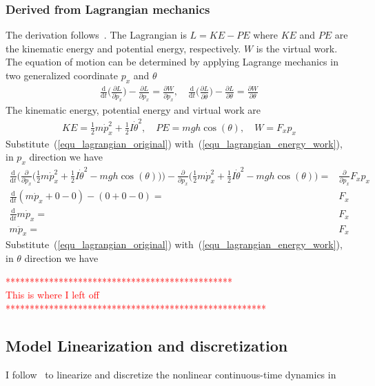 \documentclass[12pt]{article}
\begin{document}
\subsubsection{Derived from Lagrangian mechanics}
The derivation follows~\cite{peacock_2007_mit_lagrange}.
The Lagrangian is $L=KE-PE$ where $KE$ and $PE$ are the
kinematic energy and potential energy, respectively.
$W$ is the virtual work.
The equation of motion can be determined by applying
Lagrange mechanics in two generalized coordinate $p_x$ and $\theta$
\begin{align}
\label{equ_lagrangian_original}
\frac{\mathrm{d}}{\mathrm{d}t}\bigg(
\frac{\partial L}{\partial \dot{p}_x}\bigg)
-\frac{\partial L}{\partial p_x}=
\frac{\partial W}{\partial p_x}, \quad
\frac{\mathrm{d}}{\mathrm{d}t}\bigg(
\frac{\partial L}{\partial \dot{\theta}}\bigg)
-\frac{\partial L}{\partial \theta}=
\frac{\partial W}{\partial \theta}
\end{align}
The kinematic energy, potential energy and virtual work are
\begin{align}
\label{equ_lagrangian_energy_work}
KE = \frac{1}{2}m\dot{p}_x^2+\frac{1}{2}I\dot{\theta}^2,\quad
PE = mgh\cos(\theta), \quad
W = F_x p_x
\end{align}
Substitute~(\ref{equ_lagrangian_original})
with~(\ref{equ_lagrangian_energy_work}), in $p_x$ direction we have
\begin{align}
\frac{\mathrm{d}}{\mathrm{d}t}\bigg(
\frac{\partial}{\partial \dot{p}_x}\bigg(
\frac{1}{2}m\dot{p}_x^2+\frac{1}{2}I\dot{\theta}^2
-mgh\cos(\theta)\bigg)\bigg)
-\frac{\partial}{\partial p_x}\bigg(
\frac{1}{2}m\dot{p}_x^2+\frac{1}{2}I\dot{\theta}^2
-mgh\cos(\theta)\bigg)=&
\frac{\partial}{\partial p_x}F_x p_x \\
\frac{\mathrm{d}}{\mathrm{d}t}
(m\dot{p}_x +0-0)
-(0+0-0)=&
F_x \\
\frac{\mathrm{d}}{\mathrm{d}t}
m\dot{p}_x =& F_x \\
m\ddot{p}_x =& F_x
\end{align}
Substitute~(\ref{equ_lagrangian_original})
with~(\ref{equ_lagrangian_energy_work}), in $\theta$ direction we have


\textcolor{red}{ ***********************************************\\
This is where I left off \\
******************************************************}

\subsection{Model Linearization and discretization}
I follow~\cite{zhakatayev_2017_successive_linearize_MPC}
to linearize and discretize the nonlinear continuous-time dynamics
in~\cite{???}


{}
\end{document}
